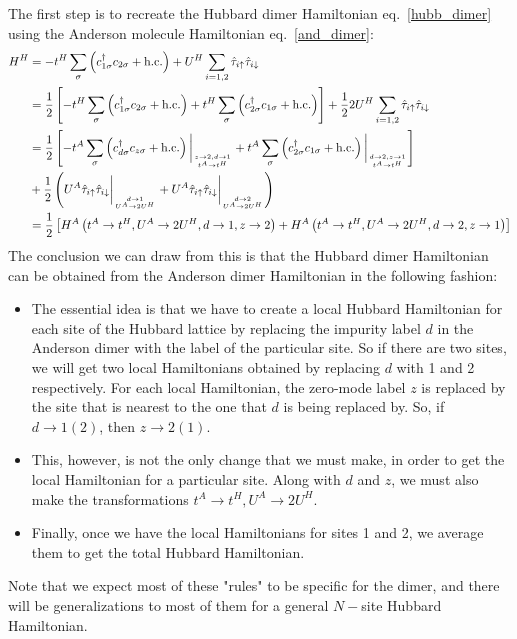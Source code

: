 \documentclass[12pt]{article}
\numberwithin{equation}{section}
\begin{document}
The first step is to recreate the Hubbard dimer Hamiltonian eq.~\ref{hubb_dimer} using the Anderson molecule Hamiltonian eq.~\ref{and_dimer}:
\begin{equation}\begin{aligned}
	H^H &= -t^H\sum_{\sigma}\left(c^\dagger_{1\sigma}c_{2\sigma} + \text{h.c.}\right) + U^H\sum_{i=1,2}\hat \tau_{i \uparrow}\hat \tau_{i \downarrow}\\
	    &= \frac{1}{2}\left[-t^H\sum_{\sigma}\left(c^\dagger_{1\sigma}c_{2\sigma} + \text{h.c.}\right) + t^H\sum_{\sigma}\left(c^\dagger_{2\sigma}c_{1\sigma} + \text{h.c.}\right)\right] + \frac{1}{2} 2U^H\sum_{i=1,2}\hat \tau_{i \uparrow}\hat \tau_{i \downarrow}\\
	    &= \frac{1}{2}\left[-t^A\sum_{\sigma}\left(c^\dagger_{d\sigma}c_{z\sigma} + \text{h.c.}\right)\bigg\vert_{z \to 2, d \to 1\atop{t^A \to t^H}} + t^A\sum_{\sigma}\left(c^\dagger_{2\sigma}c_{1\sigma} + \text{h.c.}\right)\bigg\vert_{d \to 2,z \to 1\atop{t^A \to t^H}} \right] \\
	    &+ \frac{1}{2} \left(U^A\hat \tau_{i \uparrow}\hat \tau_{i \downarrow}\bigg\vert_{d \to 1\atop{U^A \to 2U^H}} + U^A\hat \tau_{i \uparrow}\hat \tau_{i \downarrow}\bigg\vert_{d \to 2\atop{U^A \to 2U^H}}\right)\\
	    &=\frac{1}{2}\left[H^A\left(t^A \to t^H, U^A \to 2U^H, d \to 1, z \to 2\right) + H^A\left(t^A \to t^H, U^A \to 2U^H, d \to 2, z \to 1\right)\right]
\end{aligned}\end{equation}
The conclusion we can draw from this is that the Hubbard dimer Hamiltonian can be obtained from the Anderson dimer Hamiltonian in the following fashion:
\begin{itemize}
	\item The essential idea is that we have to create a local Hubbard Hamiltonian for each site of the Hubbard lattice by replacing the impurity label \(d\) in the Anderson dimer with the label of the particular site. So if there are two sites, we will get two local Hamiltonians obtained by replacing \(d\) with 1 and 2 respectively. For each local Hamiltonian, the zero-mode label \(z\) is replaced by the site that is nearest to the one that \(d\) is being replaced by. So, if \(d \to 1(2)\), then \(z \to 2(1)\).
	\item This, however, is not the only change that we must make, in order to get the local Hamiltonian for a particular site. Along with \(d\) and \(z\), we must also make the transformations \(t^A \to t^H, U^A \to 2U^H\).
	\item Finally, once we have the local Hamiltonians for sites 1 and 2, we average them to get the total Hubbard Hamiltonian.
\end{itemize}
Note that we expect most of these "rules" to be specific for the dimer, and there will be generalizations to most of them for a general \(N-\)site Hubbard Hamiltonian.
\end{document}
